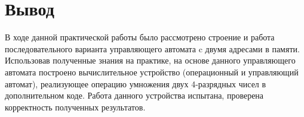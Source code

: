 \documentclass[a4paper,14pt]{extarticle}
\begin{document}
\section {Вывод}
В ходе данной практической работы было рассмотрено строение и работа последовательного варианта управляющего автомата c двумя адресами в памяти. Использовав полученные знания на практике, на основе данного управляющего автомата построено вычислительное устройство (операционный и управляющий автомат), реализующее операцию умножения двух 4-разрядных чисел в дополнительном коде. Работа данного устройства испытана, проверена корректность полученных результатов.
\end{document}
